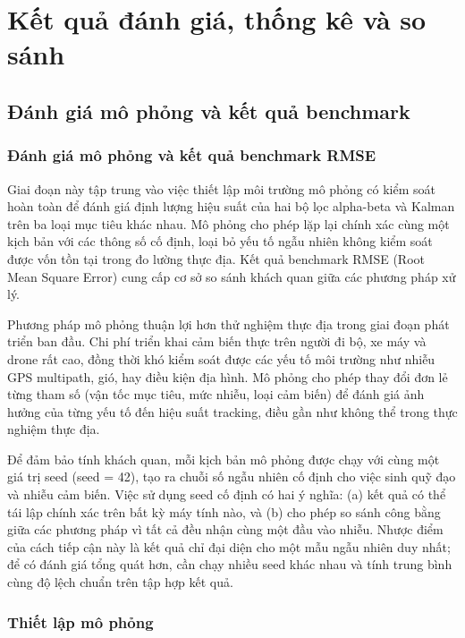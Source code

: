 \section{Kết quả đánh giá, thống kê và so sánh}

\subsection{Đánh giá mô phỏng và kết quả benchmark}

\subsubsection{Đánh giá mô phỏng và kết quả benchmark RMSE}

\hspace{0.5cm} Giai đoạn này tập trung vào việc thiết lập môi trường mô phỏng có kiểm soát hoàn toàn để đánh giá định lượng hiệu suất của hai bộ lọc alpha-beta và Kalman trên ba loại mục tiêu khác nhau. Mô phỏng cho phép lặp lại chính xác cùng một kịch bản với các thông số cố định, loại bỏ yếu tố ngẫu nhiên không kiểm soát được vốn tồn tại trong đo lường thực địa. Kết quả benchmark RMSE (Root Mean Square Error) cung cấp cơ sở so sánh khách quan giữa các phương pháp xử lý.

Phương pháp mô phỏng thuận lợi hơn thử nghiệm thực địa trong giai đoạn phát triển ban đầu. Chi phí triển khai cảm biến thực trên người đi bộ, xe máy và drone rất cao, đồng thời khó kiểm soát được các yếu tố môi trường như nhiễu GPS multipath, gió, hay điều kiện địa hình. Mô phỏng cho phép thay đổi đơn lẻ từng tham số (vận tốc mục tiêu, mức nhiễu, loại cảm biến) để đánh giá ảnh hưởng của từng yếu tố đến hiệu suất tracking, điều gần như không thể trong thực nghiệm thực địa.

Để đảm bảo tính khách quan, mỗi kịch bản mô phỏng được chạy với cùng một giá trị seed (seed = 42), tạo ra chuỗi số ngẫu nhiên cố định cho việc sinh quỹ đạo và nhiễu cảm biến. Việc sử dụng seed cố định có hai ý nghĩa: (a) kết quả có thể tái lập chính xác trên bất kỳ máy tính nào, và (b) cho phép so sánh công bằng giữa các phương pháp vì tất cả đều nhận cùng một đầu vào nhiễu. Nhược điểm của cách tiếp cận này là kết quả chỉ đại diện cho một mẫu ngẫu nhiên duy nhất; để có đánh giá tổng quát hơn, cần chạy nhiều seed khác nhau và tính trung bình cùng độ lệch chuẩn trên tập hợp kết quả.

\subsubsection{Thiết lập mô phỏng}

